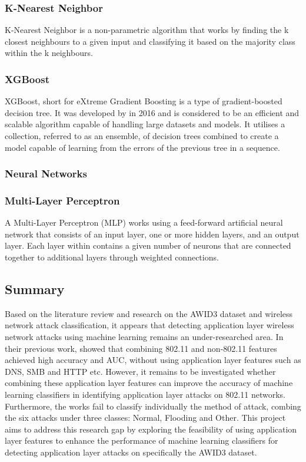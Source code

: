 \subsubsection{K-Nearest Neighbor}

K-Nearest Neighbor is a non-parametric algorithm that works by finding the k closest neighbours to a given input and classifying it based on the majority class within the k neighbours. 

\subsubsection{XGBoost}

XGBoost, short for eXtreme Gradient Boosting is a type of gradient-boosted decision tree. It was developed by \citeauthor{XGBoost} in 2016 and is considered to be an efficient and scalable algorithm capable of handling large datasets and models. It utilises a collection, referred to as an ensemble, of decision trees combined to create a model capable of learning from the errors of the previous tree in a sequence. 

\subsubsection{Neural Networks}

\subsubsection*{Multi-Layer Perceptron}

A Multi-Layer Perceptron (MLP) works using a feed-forward artificial neural network that consists of an input layer, one or more hidden layers, and an output layer. Each layer within contains a given number of neurons that are connected together to additional layers through weighted connections. 


\subsection{Summary}

Based on the literature review and research on the AWID3 dataset and wireless network attack classification, it appears that detecting application layer wireless network attacks using machine learning remains an under-researched area. In their previous work, \cite{s22155633} showed that combining 802.11 and non-802.11 features achieved high accuracy and AUC, without using application layer features such as DNS, SMB and HTTP etc. However, it remains to be investigated whether combining these application layer features can improve the accuracy of machine learning classifiers in identifying application layer attacks on 802.11 networks. Furthermore, the works fail to classify individually the method of attack, combing the six attacks under three classes: Normal, Flooding and Other. This project aims to address this research gap by exploring the feasibility of using application layer features to enhance the performance of machine learning classifiers for detecting application layer attacks on specifically the AWID3 dataset.
